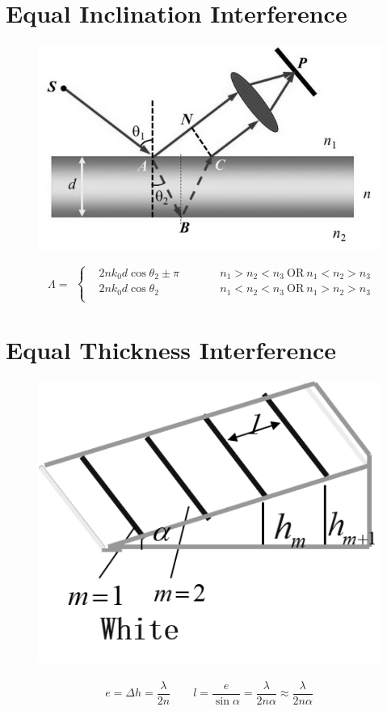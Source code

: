 \section{Equal Inclination Interference}

\begin{figure}[H]
  \centering
  \includegraphics[width=0.4\linewidth]{figures/Equal-inclination}
\end{figure}

\begin{equation*}
  \begin{aligned}
    \Lambda =
  \end{aligned}
  \left\{
    \begin{aligned}
      & 2nk_0 d \cos \theta_2 \pm \pi && \quad\quad n_1 > n_2 < n_3 \ \text{OR} \  n_1 < n_2 > n_3 \\
      & 2nk_0 d \cos \theta_2 && \quad\quad n_1 < n_2 < n_3 \  \text{OR} \  n_1 > n_2 > n_3 \\
    \end{aligned}
  \right.
\end{equation*}

\section{Equal Thickness Interference}

\begin{figure}[H]
  \centering
  \includegraphics[width=0.4\linewidth]{figures/Equal-thickness}
\end{figure}

\begin{equation*}
  \begin{aligned}
    e = \Delta h = \dfrac{\lambda}{2 n} \quad\quad l = \dfrac{e}{\sin \alpha} = \dfrac{\lambda}{2 n \alpha} \approx \dfrac{\lambda}{2 n \alpha}   
  \end{aligned}
\end{equation*}

